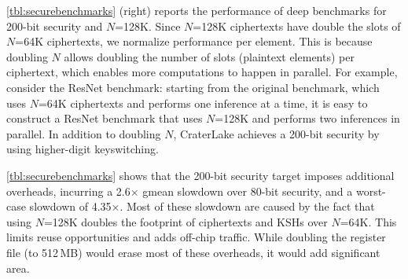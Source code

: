 \autoref{tbl:securebenchmarks} (right) reports the performance of deep
benchmarks for 200-bit security and $N$=128K. Since $N$=128K ciphertexts have
double the slots of $N$=64K ciphertexts, we normalize performance per element.
This is because doubling $N$ allows doubling the number of slots (plaintext
elements) per ciphertext, which enables more computations to happen in
parallel. For example, consider the ResNet benchmark: starting from the
original benchmark, which uses $N$=64K ciphertexts and performs one inference
at a time, it is easy to construct a ResNet benchmark that uses $N$=128K and
performs two inferences in parallel. In addition to doubling $N$, CraterLake
achieves a 200-bit security by using higher-digit keyswitching.

\autoref{tbl:securebenchmarks} shows that the 200-bit security target imposes
additional overheads, incurring a 2.6$\times$ gmean slowdown over 80-bit
security, and a worst-case slowdown of 4.35$\times$. Most of these slowdown are
caused by the fact that using $N$=128K doubles the footprint of ciphertexts and
KSHs over $N$=64K. This limits reuse opportunities and adds off-chip traffic.
While doubling the register file (to 512\,MB) would erase most of these
overheads, it would add significant area.
